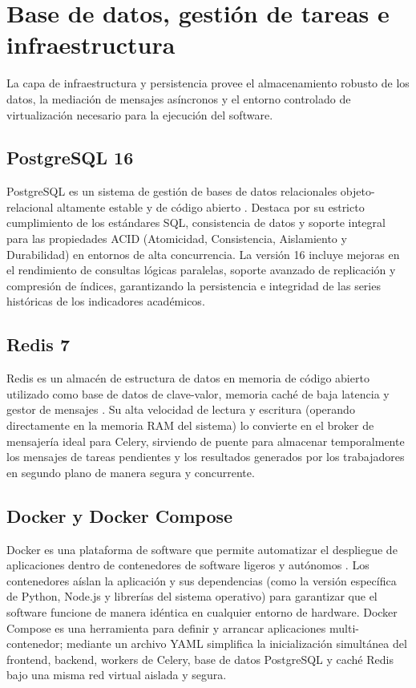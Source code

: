 \section{Base de datos, gestión de tareas e infraestructura}

La capa de infraestructura y persistencia provee el almacenamiento robusto de los datos, la mediación de mensajes asíncronos y el entorno controlado de virtualización necesario para la ejecución del software.

\subsection{PostgreSQL 16}
PostgreSQL es un sistema de gestión de bases de datos relacionales objeto-relacional altamente estable y de código abierto \cite{postgresql2024}. Destaca por su estricto cumplimiento de los estándares SQL, consistencia de datos y soporte integral para las propiedades ACID (Atomicidad, Consistencia, Aislamiento y Durabilidad) en entornos de alta concurrencia. La versión 16 incluye mejoras en el rendimiento de consultas lógicas paralelas, soporte avanzado de replicación y compresión de índices, garantizando la persistencia e integridad de las series históricas de los indicadores académicos.

\subsection{Redis 7}
Redis es un almacén de estructura de datos en memoria de código abierto utilizado como base de datos de clave-valor, memoria caché de baja latencia y gestor de mensajes \cite{carlson2013}. Su alta velocidad de lectura y escritura (operando directamente en la memoria RAM del sistema) lo convierte en el broker de mensajería ideal para Celery, sirviendo de puente para almacenar temporalmente los mensajes de tareas pendientes y los resultados generados por los trabajadores en segundo plano de manera segura y concurrente.

\subsection{Docker y Docker Compose}
Docker es una plataforma de software que permite automatizar el despliegue de aplicaciones dentro de contenedores de software ligeros y autónomos \cite{merkel2014}. Los contenedores aíslan la aplicación y sus dependencias (como la versión específica de Python, Node.js y librerías del sistema operativo) para garantizar que el software funcione de manera idéntica en cualquier entorno de hardware. Docker Compose es una herramienta para definir y arrancar aplicaciones multi-contenedor; mediante un archivo YAML simplifica la inicialización simultánea del frontend, backend, workers de Celery, base de datos PostgreSQL y caché Redis bajo una misma red virtual aislada y segura.

